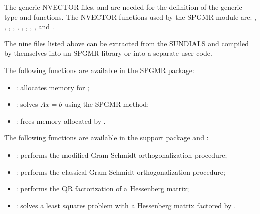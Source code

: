 \documentclass[letterpaper,10pt,english]{sphinxmanual}
\begin{document}
The generic NVECTOR files,  and
 are needed for the definition of the generic
 type and functions.  The NVECTOR functions used by the
SPGMR module are: {\hyperref[nvectors/index:N_VDotProd]{}}, {\hyperref[nvectors/index:N_VLinearSum]{}},
{\hyperref[nvectors/index:N_VScale]{}}, {\hyperref[nvectors/index:N_VProd]{}}, {\hyperref[nvectors/index:N_VDiv]{}},
{\hyperref[nvectors/index:N_VConst]{}}, {\hyperref[nvectors/index:N_VClone]{}},
, {\hyperref[nvectors/index:N_VDestroy]{}}, and
.

The nine files listed above can be extracted from the SUNDIALS
 and compiled by themselves into an SPGMR library or into a
separate user code.

The following functions are available in the SPGMR package:
\begin{itemize}
\item {} 
: allocates memory for ;

\item {} 
: solves $Ax = b$ using the SPGMR method;

\item {} 
: frees memory allocated by .

\end{itemize}

The following functions are available in the support package
 and :
\begin{itemize}
\item {} 
: performs the modified Gram-Schmidt orthogonalization
procedure;

\item {} 
: performs the classical Gram-Schmidt
orthogonalization procedure;

\item {} 
: performs the QR factorization of a Hessenberg matrix;

\item {} 
: solves a least squares problem with a Hessenberg matrix
factored by .

\end{itemize}
\end{document}
